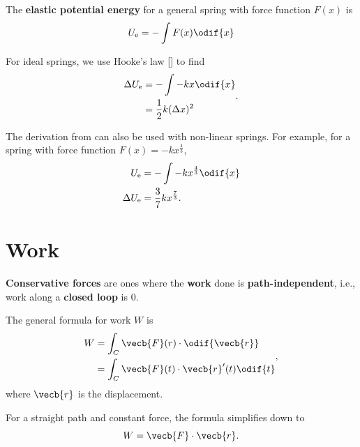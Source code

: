 The \textbf{elastic potential energy} for a general spring with force
function \(F(x)\) is
\begin{equation} \label{eq:general-elastic-potential-energy}
    U_\mathrm{e} = - \int F(x) \odif{x}
\end{equation}

For ideal springs, we use Hooke's law [] to find
\begin{equation}
    \begin{aligned}
        \Delta{U_\mathrm{e}} &= - \int - k x \odif{x} \\
        &= \frac{1}{2} k (\Delta{x})^2
    \end{aligned}.
\end{equation}

The derivation from  can
also be used with non-linear springs.
For example, for a spring with force function \(F(x) = -k x^\frac{4}{3}\),
\begin{equation}
    \begin{aligned}
        U_\mathrm{e} &= - \int - k x^\frac{4}{3} \odif{x} \\
        \Delta{U_\mathrm{e}} &= \frac{3}{7} k x^\frac{7}{3}.
    \end{aligned}
\end{equation}

\section{Work}

\textbf{Conservative forces} are ones where the \textbf{work} done is
\textbf{path-independent},
i.e., work along a \textbf{closed loop} is 0.

The general formula for work \(W\) is
\begin{equation} \label{eq:work}
    \begin{aligned}
        W &= \int_C \vecb{F}(r) \cdot \odif{\vecb{r}} \\
        &= \int_C \vecb{F}(t) \cdot \vecb{r}'(t) \odif{t} \\
    \end{aligned},
\end{equation}
where \(\vecb{r}\) is the displacement.

For a straight path and constant force,
the formula simplifies down to
\begin{equation*}
    W = \vecb{F} \cdot \vecb{r}.
\end{equation*}

